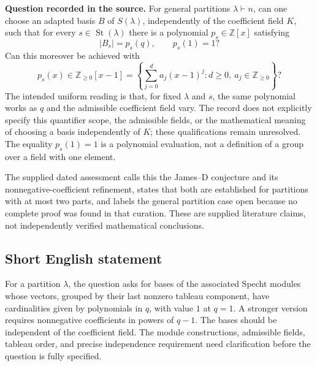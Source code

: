 \documentclass[11pt]{article}
\begin{document}
\textbf{Question recorded in the source.} For general partitions \(\lambda\vdash n\), can one choose an adapted basis \(B\) of \(S(\lambda)\), independently of the coefficient field \(K\), such that for every \(s\in\operatorname{St}(\lambda)\) there is a polynomial \(p_s\in\mathbb Z[x]\) satisfying
\[
|B_s|=p_s(q),\qquad p_s(1)=1?
\]
Can this moreover be achieved with
\[
p_s(x)\in\mathbb Z_{\geq0}[x-1]
=\left\{\sum_{j=0}^{d}a_j(x-1)^j:d\geq0,\ a_j\in\mathbb Z_{\geq0}\right\}?
\]
The intended uniform reading is that, for fixed \(\lambda\) and \(s\), the same polynomial works as \(q\) and the admissible coefficient field vary. The record does not explicitly specify this quantifier scope, the admissible fields, or the mathematical meaning of choosing a basis independently of \(K\); these qualifications remain unresolved. The equality \(p_s(1)=1\) is a polynomial evaluation, not a definition of a group over a field with one element.

The supplied dated assessment calls this the James--D conjecture and its nonnegative-coefficient refinement, states that both are established for partitions with at most two parts, and labels the general partition case open because no complete proof was found in that curation. These are supplied literature claims, not independently verified mathematical conclusions.
\subsection{Short English statement}
For a partition \(\lambda\), the question asks for bases of the associated Specht modules whose vectors, grouped by their last nonzero tableau component, have cardinalities given by polynomials in \(q\), with value \(1\) at \(q=1\). A stronger version requires nonnegative coefficients in powers of \(q-1\). The bases should be independent of the coefficient field. The module constructions, admissible fields, tableau order, and precise independence requirement need clarification before the question is fully specified.
\end{document}
